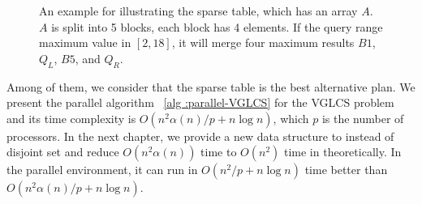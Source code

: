 \begin{figure*}[!thb]
  \centering
  \caption{   
An example for illustrating the sparse table, which has
an array $A$. $A$ is split into 5 blocks, each block has 4 elements.
If the query range maximum value in $[2, 18]$, it will merge four
maximum results $B1$, $Q_L$, $B5$, and $Q_R$.  
}

  \label{fig:interval-decomposition}
\end{figure*}

Among of them, we consider that the sparse table is the best
alternative plan.  We present the parallel algorithm ~\ref{alg
:parallel-VGLCS} for the VGLCS problem and its time complexity is
$O(n^2 \alpha(n) / p + n \log n)$, which $p$ is the number of
processors. In the next chapter, we provide a new data structure to
instead of disjoint set and reduce $O(n^2 \alpha(n))$ time to $O(n^2)$
time in theoretically.  In the parallel environment, it can run in
$O(n^2 /p + n \log n)$ time better than $O(n^2 \alpha(n)/p + n \log
n)$.

